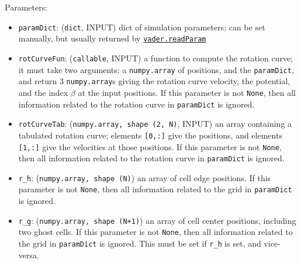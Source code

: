 \documentclass[12pt]{article}
\begin{document}
Parameters:
\begin{itemize}
\item \texttt{paramDict}: (\texttt{dict}, INPUT) dict of simulation parameters; can be set manually, but usually returned by \hyperref[sssec:vader.readParam]{\texttt{vader.readParam}}
\item \texttt{rotCurveFun}: (\texttt{callable}, INPUT) a function to compute the rotation curve; it must take two arguments: a \verb=numpy.array= of positions, and the \verb=paramDict=, and return 3 \verb=numpy.array=s giving the rotation curve velocity, the potential, and the index $\beta$ at the input positions. If this parameter is not \verb=None=, then all information related to the rotation curve in \texttt{paramDict} is ignored.
\item \texttt{rotCurveTab}: (\texttt{numpy.array, shape (2, N)}, INPUT) an array containing a tabulated rotation curve; elements \verb=[0,:]= give the positions, and elements \verb=[1,:]= give the velocities at those positions. If this parameter is not \verb=None=, then all information related to the rotation curve in \texttt{paramDict} is ignored.
\item \verb=r_h=: (\texttt{numpy.array, shape (N)}) an array of cell edge positions. If this parameter is not \verb=None=, then all information related to the grid in \texttt{paramDict} is ignored.
\item \verb=r_g=: (\texttt{numpy.array, shape (N+1)}) an array of cell center positions, including two ghost cells. If this parameter is not \verb=None=, then all information related to the grid in \texttt{paramDict} is ignored. This must be set if \verb=r_h= is set, and vice-versa.
\end{itemize}
\end{document}
